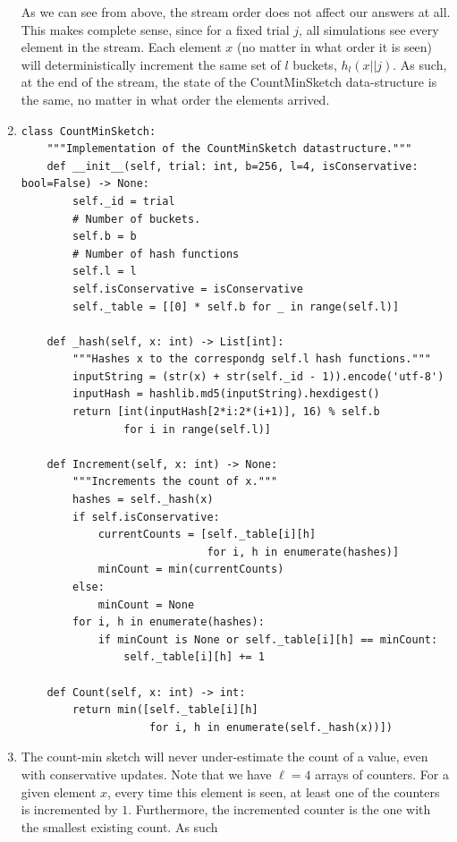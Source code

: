 \documentclass[12pt]{article}
\begin{document}
\begin{enumerate}[label=(\alph*)]
    As we can see from above, the stream order does not affect our answers at all. This makes complete sense, since for a fixed trial $j$, all simulations see every element in the stream. Each element $x$ (no matter in what order it is seen) will deterministically increment the same set of $l$ buckets, $h_l(x || j)$. As such, at the end of the stream, the state of the CountMinSketch data-structure is the same, no matter in what order the elements arrived.
  \item 
\begin{verbatim}
class CountMinSketch:
    """Implementation of the CountMinSketch datastructure."""
    def __init__(self, trial: int, b=256, l=4, isConservative: bool=False) -> None:
        self._id = trial
        # Number of buckets.
        self.b = b
        # Number of hash functions
        self.l = l
        self.isConservative = isConservative
        self._table = [[0] * self.b for _ in range(self.l)]
        
    def _hash(self, x: int) -> List[int]:
        """Hashes x to the correspondg self.l hash functions."""
        inputString = (str(x) + str(self._id - 1)).encode('utf-8')
        inputHash = hashlib.md5(inputString).hexdigest()
        return [int(inputHash[2*i:2*(i+1)], 16) % self.b
                for i in range(self.l)]
        
    def Increment(self, x: int) -> None:
        """Increments the count of x."""
        hashes = self._hash(x)
        if self.isConservative:
            currentCounts = [self._table[i][h]
                             for i, h in enumerate(hashes)]
            minCount = min(currentCounts)
        else:
            minCount = None
        for i, h in enumerate(hashes):
            if minCount is None or self._table[i][h] == minCount:
                self._table[i][h] += 1      
        
    def Count(self, x: int) -> int:
        return min([self._table[i][h]
                    for i, h in enumerate(self._hash(x))])
\end{verbatim}
    \item
      The count-min sketch will never under-estimate the count of a value, even with conservative updates. Note that we have $\ell = 4$ arrays of counters. For a given element $x$, every time this element is seen, at least one of the counters is incremented by $1$. Furthermore, the incremented counter is the one with the smallest existing count. As such


\end{enumerate}
\end{document}
